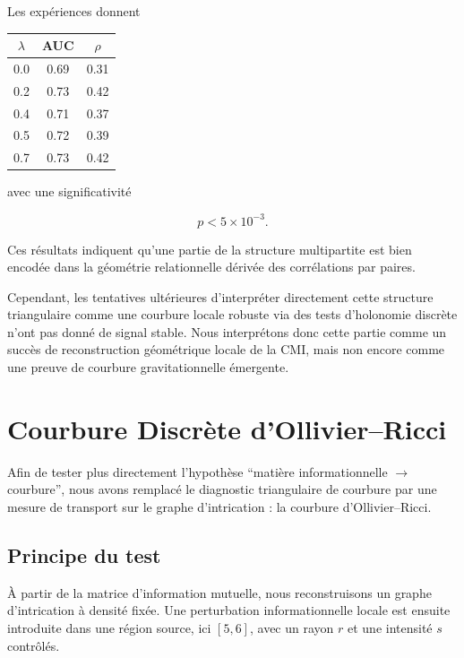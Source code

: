 \documentclass[11pt]{article}
\begin{document}
Les expériences donnent

\begin{center}
\begin{tabular}{ccc}
\toprule
$\lambda$ & AUC & $\rho$ \\
\midrule
0.0 & 0.69 & 0.31 \\
0.2 & 0.73 & 0.42 \\
0.4 & 0.71 & 0.37 \\
0.5 & 0.72 & 0.39 \\
0.7 & 0.73 & 0.42 \\
\bottomrule
\end{tabular}
\end{center}

avec une significativité

\[
p < 5\times10^{-3}.
\]

Ces résultats indiquent qu'une partie de la structure multipartite est bien encodée dans la géométrie relationnelle dérivée des corrélations par paires.

Cependant, les tentatives ultérieures d'interpréter directement cette structure triangulaire comme une courbure locale robuste via des tests d'holonomie discrète n'ont pas donné de signal stable. Nous interprétons donc cette partie comme un succès de reconstruction géométrique locale de la CMI, mais non encore comme une preuve de courbure gravitationnelle émergente.


\section{Courbure Discrète d'Ollivier--Ricci}

Afin de tester plus directement l'hypothèse ``matière informationnelle $\rightarrow$ courbure'', nous avons remplacé le diagnostic triangulaire de courbure par une mesure de transport sur le graphe d'intrication : la courbure d'Ollivier--Ricci.

\subsection{Principe du test}

À partir de la matrice d'information mutuelle, nous reconstruisons un graphe d'intrication à densité fixée. Une perturbation informationnelle locale est ensuite introduite dans une région source, ici $[5,6]$, avec un rayon $r$ et une intensité $s$ contrôlés.
\end{document}
